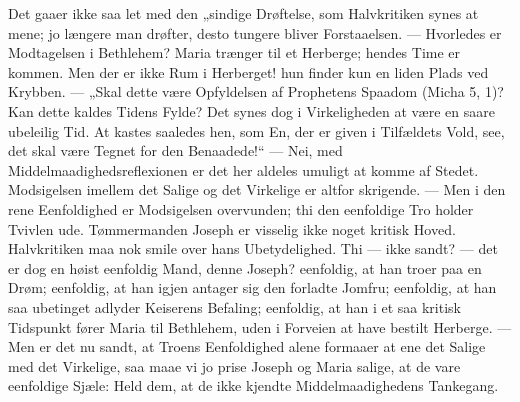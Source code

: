 \documentclass[12pt,a4paper]{book}
\begin{document}
Det gaaer ikke saa let med den „sindige Drøftelse, som Halvkritiken synes at mene; jo
længere man drøfter, desto tungere bliver Forstaaelsen. --- Hvorledes er Modtagelsen i
Bethlehem? Maria trænger til et Herberge; hendes Time er kommen. Men der er ikke Rum i
Herberget! hun finder kun en liden Plads ved Krybben. --- „Skal dette være Opfyldelsen
af Prophetens Spaadom (Micha 5, 1)? Kan dette kaldes Tidens Fylde? Det synes dog i
Virkeligheden at være en saare ubeleilig Tid. At kastes saaledes hen, som En, der er
given i Tilfældets Vold, see, det skal være Tegnet for den Benaadede!“ --- Nei, med
Middelmaadighedsreflexionen er det her aldeles umuligt at komme af Stedet. Modsigelsen
imellem det Salige og det Virkelige er altfor skrigende. --- Men i den rene
Eenfoldighed er Modsigelsen overvunden; thi den eenfoldige Tro holder Tvivlen ude.
Tømmermanden Joseph er visselig ikke noget kritisk Hoved. Halvkritiken maa nok smile
over hans Ubetydelighed. Thi --- ikke sandt? --- det er dog en høist eenfoldig Mand,
denne Joseph? eenfoldig, at han troer paa en Drøm; eenfoldig, at han igjen antager sig
den forladte Jomfru; eenfoldig, at han saa ubetinget adlyder Keiserens Befaling;
eenfoldig, at han i et saa kritisk Tidspunkt fører Maria til Bethlehem, uden i
Forveien at have bestilt Herberge. --- Men er det nu sandt, at Troens Eenfoldighed
alene formaaer at ene det Salige med det Virkelige, saa maae vi jo prise Joseph og
Maria salige, at de vare eenfoldige Sjæle: Held dem, at de ikke kjendte
Middelmaadighedens Tankegang.
\end{document}
